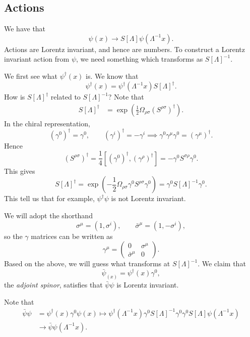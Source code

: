 \documentclass[12pt]{article}
\begin{document}
\subsection{Actions}%
\label{sub:spin_acts}

We have that
\[
	\psi(x) \to S[\Lambda] \psi(\Lambda^{-1} x).
\]
Actions are Lorentz invariant, and hence are numbers. To construct a Lorentz invariant action from $\psi$, we need something which transforms as $S[\Lambda]^{-1}$.

We first see what $\psi^{\dagger}(x)$ is. We know that
\[
	\psi^{\dagger}(x) = \psi^{\dagger}(\Lambda^{-1} x) S[\Lambda]^{\dagger}.
\]
How is $S[\Lambda]^{\dagger}$ related to $S[\Lambda]^{-1}$? Note that
\begin{align*}
	S[\Lambda]^{\dagger} &= \exp \left( \frac 12 \Omega_{\rho\sigma} (S^{\rho\sigma})^{\dagger} \right).
\end{align*}
In the chiral representation,
\[
	(\gamma^0)^{\dagger} = \gamma^0, \qquad (\gamma^i)^{\dagger} = - \gamma^i \implies \gamma^0 \gamma^\mu \gamma^0 = (\gamma^\mu)^{\dagger}.
\]
Hence
\[
	(S^{\rho\sigma})^{\dagger} = \frac 14 [(\gamma^0)^{\dagger}, (\gamma^{\rho})^{\dagger}] = - \gamma^0 S^{\sigma\rho} \gamma^0.
\]
This gives
\[
	S[\Lambda]^{\dagger} = \exp \left( - \frac 12 \Omega_{\rho\sigma} \gamma^0 S^{\rho\sigma} \gamma^0 \right) = \gamma^0 S[\Lambda]^{-1} \gamma^0.
\]
This tell us that for example, $\psi^{\dagger} \psi$ is not Lorentz invariant.


We will adopt the shorthand
\[
\sigma^\mu = (1, \sigma^i), \qquad \bar \sigma^\mu = (1, -\sigma^i),
\]
so the $\gamma$ matrices can be written as
\[
\gamma^{\mu} =
\begin{pmatrix}
	0 & \sigma^{\mu} \\ \bar \sigma^\mu & 0
\end{pmatrix}.
\]
Based on the above, we will guess what transforms at $S[\Lambda]^{-1}$. We claim that
\[
\bar \psi_{(x)} = \psi^{\dagger}(x) \gamma^{0},
\]
the \emph{adjoint spinor}, satisfies that $\bar \psi \psi$ is Lorentz invariant.

\begin{proofbox}
	Note that
	\begin{align*}
		\bar \psi \psi &= \psi^{\dagger}(x) \gamma^0 \psi(x) \mapsto \psi^{\dagger}(\Lambda^{-1}x) \gamma^0 S[\Lambda]^{-1} \gamma^0 \gamma^0 S[\Lambda] \psi(\Lambda^{-1} x) \\
			       &\to \bar \psi \psi(\Lambda^{-1} x).
	\end{align*}
\end{proofbox}
\end{document}
